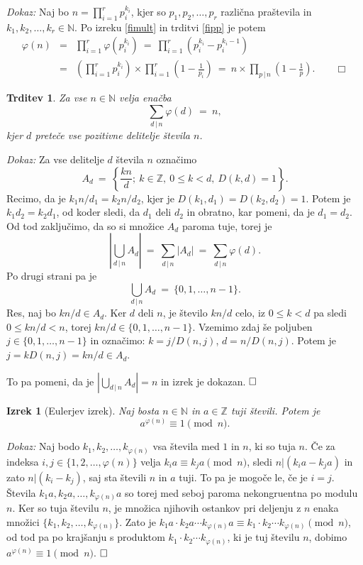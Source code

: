 \documentclass[a4paper,12pt]{article}
\def\N{\mathbb{N}} %
\def\Z{\mathbb{Z}} %
\def\qed{$\hfill\Box$}   %
\def\qedm{\qquad\Box}   %
\newtheorem{izrek}{Izrek}
\newtheorem{trditev}{Trditev}
\begin{document}
\noindent
{\em Dokaz:\/} Naj bo $n = \prod_{i=1}^r p_i^{k_i}$,
kjer so $p_1, p_2, \ldots, p_r$ različna praštevila in $k_1, k_2, \ldots, k_r \in \N$. Po izreku 
\ref{fimult} in trditvi \ref{fipp} je potem
\begin{eqnarray*}
\varphi(n) &=& \prod_{i=1}^r \varphi\left(p_i^{k_i}\right)
\ =\ \prod_{i=1}^r \left(p_i^{k_i} - p_i^{k_i-1}\right) \\
 &=& \left(\prod_{i=1}^r p_i^{k_i}\right) \times \prod_{i=1}^r \left(1 - \frac{1}{p_i}\right)
\ =\ n \times \prod_{p\,|\,n} \left(1 - \frac{1}{p}\right). \qedm
\end{eqnarray*}


\begin{trditev}
Za vse $n \in \N$ velja enačba
\begin{equation}
\label{fisum}
\sum_{d\,|\,n} \varphi(d)\ =\  n,
\end{equation}
kjer $d$ preteče vse pozitivne delitelje števila $n$.
\end{trditev}

\noindent
{\em Dokaz:\/} Za vse delitelje $d$ števila $n$ označimo
\[
A_d\ =\ \left\{\frac{k n}{d};\ k \in \Z,\ 0 \le k < d,\ D(k,d) = 1\right\}.
\]
Recimo, da je $k_1 n/d_1 = k_2 n/d_2$, kjer je $D(k_1,d_1) = D(k_2,d_2) = 1$. Potem 
je $k_1 d_2 = k_2 d_1$, od koder sledi, da $d_1$ deli $d_2$ in obratno, kar pomeni,
da je $d_1 = d_2$. Od tod zaključimo, da so si množice $A_d$ paroma tuje,
torej je
\[
\left|\bigcup_{d\,|\,n} A_d\right|\ =\ \sum_{d\,|\,n} |A_d|\ =\ \sum_{d\,|\,n} \varphi(d).
\]
Po drugi strani pa je
\[
\bigcup_{d\,|\,n} A_d\ =\ \{0, 1, \ldots, n-1\}.
\]
Res, naj bo $k n/d \in A_d$. Ker $d$ deli $n$, je število $k n/d$ celo, iz $0 \le k < d$ pa sledi $0 \le k n/d < n$,
torej $k n/d \in \{0, 1, \ldots, n-1\}$. Vzemimo zdaj še poljuben $j \in \{0, 1, \ldots, n-1\}$
in označimo: $k = j/D(n,j)$, $d = n/D(n,j)$. Potem je $j = k D(n,j) = k n/d \in A_d$.

To pa pomeni, da je $\left|\bigcup_{d\,|\,n} A_d\right| = n$ in izrek je dokazan. \qed

\begin{izrek}[Eulerjev izrek]
Naj bosta $n \in \N$ in $a \in \Z$ tuji števili. Potem je
\[
a^{\varphi(n)} \equiv 1 \pmod{n}.
\]
\end{izrek}

\noindent
{\em Dokaz:\/} Naj bodo $k_1, k_2, \ldots, k_{\varphi(n)}$ vsa števila med $1$ in $n$, ki so tuja $n$. Če za indeksa $i,j \in \{1,2,\ldots,\varphi(n)\}$ velja $k_i a \equiv k_j a \!\!\!\pmod{n}$, sledi $n | (k_i a - k_j a)$ in zato $n | (k_i - k_j)$, saj sta števili $n$ in $a$ tuji. To pa je mogoče le, če je $i = j$. Števila  $k_1 a, k_2 a, \ldots, k_{\varphi(n)} a$ so torej med seboj paroma nekongruentna po modulu $n$. Ker so tuja številu $n$, je množica njihovih ostankov pri deljenju z $n$ enaka množici $\{k_1, k_2, \ldots, k_{\varphi(n)}\}$. Zato je $k_1 a\cdot k_2 a\cdots k_{\varphi(n)} a \equiv k_1\cdot k_2 \cdots k_{\varphi(n)} \pmod{n}$, od tod pa po krajšanju s produktom $ k_1\cdot k_2 \cdots k_{\varphi(n)}$, ki je tuj številu $n$, dobimo $a^{\varphi(n)} \equiv 1 \!\!\!\pmod{n}$. \qed
\end{document}
